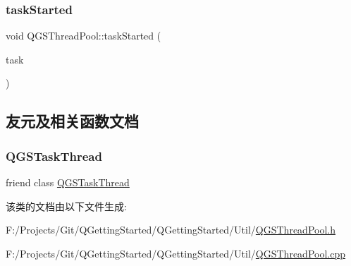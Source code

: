 \mbox{\label{class_q_g_s_thread_pool_a77cbc788b1b7b7be3d031f3a734f0c0b}} 
\subsubsection{\texorpdfstring{task\+Started}{taskStarted}}
{\footnotesize\ttfamily void Q\+G\+S\+Thread\+Pool\+::task\+Started (\begin{DoxyParamCaption}\item[{\mbox{\hyperlink{class_q_g_s_task}{Q\+G\+S\+Task}} $\ast$}]{task }\end{DoxyParamCaption})\hspace{0.3cm}{\ttfamily [signal]}}



\subsection{友元及相关函数文档}
\mbox{\label{class_q_g_s_thread_pool_aecc60efeed05d1eec7e38fa804a1a80e}} 
\subsubsection{\texorpdfstring{Q\+G\+S\+Task\+Thread}{QGSTaskThread}}
{\footnotesize\ttfamily friend class \mbox{\hyperlink{class_q_g_s_task_thread}{Q\+G\+S\+Task\+Thread}}\hspace{0.3cm}{\ttfamily [friend]}}



该类的文档由以下文件生成\+:\begin{DoxyCompactItemize}
\item 
F\+:/\+Projects/\+Git/\+Q\+Getting\+Started/\+Q\+Getting\+Started/\+Util/\mbox{\hyperlink{_q_g_s_thread_pool_8h}{Q\+G\+S\+Thread\+Pool.\+h}}\item 
F\+:/\+Projects/\+Git/\+Q\+Getting\+Started/\+Q\+Getting\+Started/\+Util/\mbox{\hyperlink{_q_g_s_thread_pool_8cpp}{Q\+G\+S\+Thread\+Pool.\+cpp}}\end{DoxyCompactItemize}
